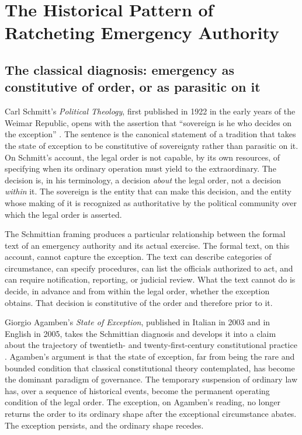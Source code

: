 \section{The Historical Pattern of Ratcheting Emergency Authority}
\label{sec:pattern}

\subsection{The classical diagnosis: emergency as constitutive of order, or as parasitic on it}

Carl Schmitt's \emph{Political Theology}, first published in 1922 in the early years of the Weimar Republic,
opens with the assertion that ``sovereign is he who decides on the exception''
\cite{TODO_schmitt_political_theology}.
The sentence is the canonical statement of a tradition that takes the state of exception to be
constitutive of sovereignty rather than parasitic on it.
On Schmitt's account, the legal order is not capable, by its own resources,
of specifying when its ordinary operation must yield to the extraordinary.
The decision is, in his terminology, a decision \emph{about} the legal order,
not a decision \emph{within} it.
The sovereign is the entity that can make this decision, and the entity whose making of it is recognized
as authoritative by the political community over which the legal order is asserted.

The Schmittian framing produces a particular relationship between the formal text of an emergency authority
and its actual exercise.
The formal text, on this account, cannot capture the exception.
The text can describe categories of circumstance, can specify procedures, can list the officials authorized to act,
and can require notification, reporting, or judicial review.
What the text cannot do is decide, in advance and from within the legal order,
whether the exception obtains.
That decision is constitutive of the order and therefore prior to it.

Giorgio Agamben's \emph{State of Exception}, published in Italian in 2003 and in English in 2005,
takes the Schmittian diagnosis and develops it into a claim about the trajectory of twentieth- and
twenty-first-century constitutional practice \cite{TODO_agamben_state_of_exception}.
Agamben's argument is that the state of exception, far from being the rare and bounded condition that
classical constitutional theory contemplated, has become the dominant paradigm of governance.
The temporary suspension of ordinary law has, over a sequence of historical events,
become the permanent operating condition of the legal order.
The exception, on Agamben's reading, no longer returns the order to its ordinary shape after the
exceptional circumstance abates.
The exception persists, and the ordinary shape recedes.

